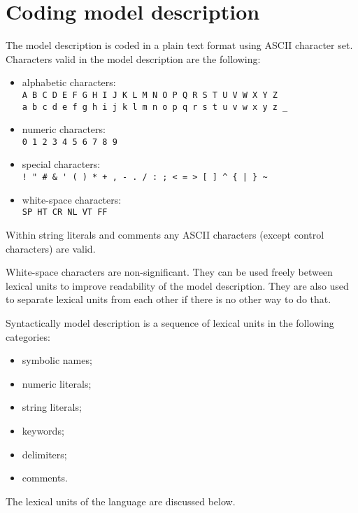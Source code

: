 \documentclass[11pt]{report}
\begin{document}

\chapter{Coding model description}
\label{coding}

The model description is coded in a plain text format using ASCII
character set. Characters valid in the model description are the
following:

\begin{itemize}
\item alphabetic characters:\\
\verb|A B C D E F G H I J K L M N O P Q R S T U V W X Y Z|\\
\verb|a b c d e f g h i j k l m n o p q r s t u v w x y z _|
\item numeric characters:\\
\verb|0 1 2 3 4 5 6 7 8 9|
\item special characters:\\
\verb?! " # & ' ( ) * + , - . / : ; < = > [ ] ^ { | } ~?
\item white-space characters:\\
\verb|SP HT CR NL VT FF|
\end{itemize}

Within string literals and comments any ASCII characters (except
control characters) are valid.

White-space characters are non-significant. They can be used freely
between lexical units to improve readability of the model description.
They are also used to separate lexical units from each other if there
is no other way to do that.

Syntactically model description is a sequence of lexical units in the
following categories:

\begin{itemize}
\item symbolic names;
\item numeric literals;
\item string literals;
\item keywords;
\item delimiters;
\item comments.
\end{itemize}

The lexical units of the language are discussed below.

\newpage
\end{document}
